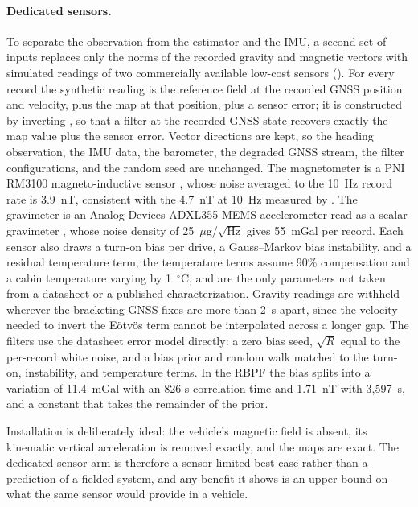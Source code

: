 \paragraph{Dedicated sensors.}
\label{sec:dedicated-sensors}
To separate the observation from the estimator and the IMU, a second set of inputs replaces only the norms of the recorded gravity and magnetic vectors with simulated readings of two commercially available low-cost sensors (). For every record the synthetic reading is the reference field at the recorded GNSS position and velocity, plus the map at that position, plus a sensor error; it is constructed by inverting , so that a filter at the recorded GNSS state recovers exactly the map value plus the sensor error. Vector directions are kept, so the heading observation, the IMU data, the barometer, the degraded GNSS stream, the filter configurations, and the random seed are unchanged. The magnetometer is a PNI RM3100 magneto-inductive sensor \citep{rm3100}, whose noise averaged to the 10~Hz record rate is 3.9~nT, consistent with the 4.7~nT at 10~Hz measured by \citet{regoli2018investigation}. The gravimeter is an Analog Devices ADXL355 MEMS accelerometer read as a scalar gravimeter \citep{adxl355}, whose noise density of 25~\(\mu\)g/\(\sqrt{\text{Hz}}\) gives 55~mGal per record. Each sensor also draws a turn-on bias per drive, a Gauss--Markov bias instability, and a residual temperature term; the temperature terms assume 90\% compensation and a cabin temperature varying by 1~\(^\circ\)C, and are the only parameters not taken from a datasheet or a published characterization. Gravity readings are withheld wherever the bracketing GNSS fixes are more than 2~s apart, since the velocity needed to invert the E\"{o}tv\"{o}s term cannot be interpolated across a longer gap. The filters use the datasheet error model directly: a zero bias seed, \(\sqrt{R}\) equal to the per-record white noise, and a bias prior and random walk matched to the turn-on, instability, and temperature terms. In the RBPF the bias splits into a variation of 11.4~mGal with an 826-s correlation time and 1.71~nT with 3{,}597~s, and a constant that takes the remainder of the prior.

Installation is deliberately ideal: the vehicle's magnetic field is absent, its kinematic vertical acceleration is removed exactly, and the maps are exact. The dedicated-sensor arm is therefore a sensor-limited best case rather than a prediction of a fielded system, and any benefit it shows is an upper bound on what the same sensor would provide in a vehicle.

